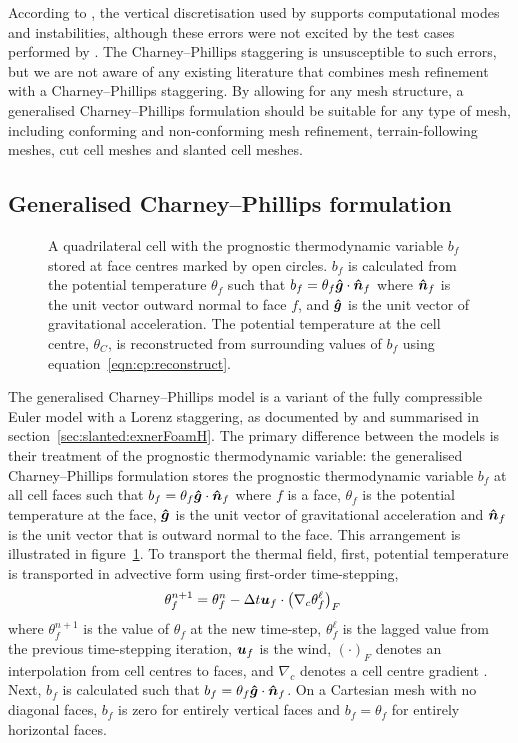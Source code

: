 According to \citet{thuburn-woolings2005}, the vertical discretisation used by \citet{yamazaki-satomura2012} supports computational modes and instabilities, although these errors were not excited by the test cases performed by \citet{yamazaki-satomura2012}.
The Charney--Phillips staggering is unsusceptible to such errors, but we are not aware of any existing literature that combines mesh refinement with a Charney--Phillips staggering.
By allowing for any mesh structure, a generalised Charney--Phillips formulation should be suitable for any type of mesh, including conforming and non-conforming mesh refinement, terrain-following meshes, cut cell meshes and slanted cell meshes.

\subsection{Generalised Charney--Phillips formulation}

\begin{figure}
	\centering
	
	\caption{A quadrilateral cell with the prognostic thermodynamic variable $b_f$ stored at face centres marked by open circles.
	$b_f$ is calculated from the potential temperature $\theta_f$ such that $b_f = \theta_f \bm{\hat{g}} \cdot \bm{\hat{n}}_f$ where $\bm{\hat{n}}_f$ is the unit vector outward normal to face $f$, and $\bm{\hat{g}}$ is the unit vector of gravitational acceleration.
	The potential temperature at the cell centre, $\theta_C$, is reconstructed from surrounding values of $b_f$ using equation~\eqref{eqn:cp:reconstruct}.}
	\label{fig:cp:staggering}
\end{figure}

The generalised Charney--Phillips model is a variant of the fully compressible Euler model with a Lorenz staggering, as documented by \citet{weller-shahrokhi2014} and summarised in section~\ref{sec:slanted:exnerFoamH}.
The primary difference between the models is their treatment of the prognostic thermodynamic variable: the generalised Charney--Phillips formulation stores the prognostic thermodynamic variable $b_f$ at all cell faces such that $b_f = \theta_f \bm{\hat{g}} \cdot \bm{\hat{n}}_f$ where $f$ is a face, $\theta_f$ is the potential temperature at the face, $\bm{\hat{g}}$ is the unit vector of gravitational acceleration and $\bm{\hat{n}}_f$ is the unit vector that is outward normal to the face.
This arrangement is illustrated in figure~\ref{fig:cp:staggering}.
To transport the thermal field, first, potential temperature is transported in advective form using first-order time-stepping,
\begin{align}
	\theta_f^{n+1} &= \theta_f^n - \Delta t \bm{u}_f \cdot \left( \nabla_c \theta_f^{\ell} \right)_F \label{eqn:cp:advection}
\end{align}
where $\theta_f^{n+1}$ is the value of $\theta_f$ at the new time-step, $\theta_f^\ell$ is the lagged value from the previous time-stepping iteration, $\bm{u}_f$ is the wind, $\left( \cdot \right)_F$ denotes an interpolation from cell centres to faces, and $\nabla_c$ denotes a cell centre gradient \citep{weller-shahrokhi2014}.
Next, $b_f$ is calculated such that $b_f = \theta_f \bm{\hat{g}} \cdot \bm{\hat{n}}_f$.  
On a Cartesian mesh with no diagonal faces, $b_f$ is zero for entirely vertical faces and $b_f = \theta_f$ for entirely horizontal faces.


